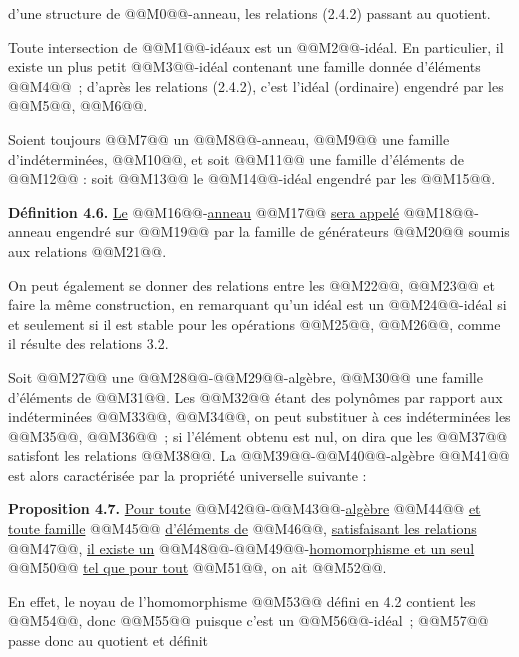 
d'une
structure de @@M0@@-anneau, les relations (2.4.2) passant au quotient.

Toute intersection de @@M1@@-idéaux est un @@M2@@-idéal. En particulier, il existe un plus petit @@M3@@-idéal contenant une famille donnée d'éléments @@M4@@~; d'après les relations (2.4.2), c'est l'idéal (ordinaire) engendré par les @@M5@@, @@M6@@.

Soient toujours @@M7@@ un @@M8@@-anneau, @@M9@@ une famille d'indéterminées, @@M10@@, et soit @@M11@@ une famille d'éléments de @@M12@@ : soit @@M13@@ le @@M14@@-idéal engendré par les @@M15@@.

\textbf{Définition 4.6.} \uline{Le} @@M16@@-\uline{anneau} @@M17@@ \uline{sera appelé} @@M18@@-anneau engendré sur @@M19@@ par la famille de générateurs @@M20@@ soumis aux relations @@M21@@.

On peut également se donner des relations entre les @@M22@@, @@M23@@ et faire la même construction, en remarquant qu'un idéal est un @@M24@@-idéal si et seulement si il est stable pour les opérations @@M25@@, @@M26@@, comme il résulte des relations 3.2.

Soit @@M27@@ une @@M28@@-@@M29@@-algèbre, @@M30@@ une famille d'éléments de @@M31@@. Les @@M32@@ étant des polynômes par rapport aux indéterminées @@M33@@, @@M34@@, on peut substituer à ces indéterminées les @@M35@@, @@M36@@~; si l'élément obtenu est nul, on dira que les @@M37@@ satisfont les relations @@M38@@. La @@M39@@-@@M40@@-algèbre @@M41@@ est alors caractérisée par la propriété universelle suivante :

\textbf{Proposition 4.7.} \uline{Pour toute} @@M42@@-@@M43@@-\uline{algèbre} @@M44@@ \uline{et toute famille} @@M45@@ \uline{d'éléments de} @@M46@@, \uline{satisfaisant les relations} @@M47@@, \uline{il existe un} @@M48@@-@@M49@@-\uline{homomorphisme et un seul} @@M50@@ \uline{tel que pour tout} @@M51@@, on ait @@M52@@.

En effet, le noyau de l'homomorphisme @@M53@@ défini en 4.2 contient les @@M54@@, donc @@M55@@ puisque c'est un @@M56@@-idéal~; @@M57@@ passe donc au quotient et définit 
